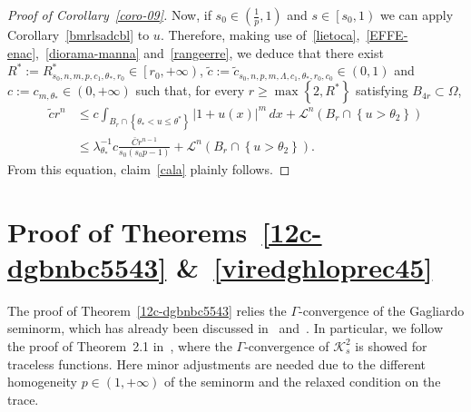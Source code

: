 \documentclass[12pt]{article}
\numberwithin{equation}{section}
\renewcommand{\leq}{\leqslant}
\renewcommand{\geq}{\geqslant}
\begin{document}
\begin{proof}[Proof of Corollary~\ref{coro-09}]
Now, if $s_0\in \left(\frac{1}{p},1\right)$ and $s\in \left[s_0,1\right)$ we can apply Corollary~\ref{bmrlsadcbl} to $u$. Therefore, making use of~\eqref{lietoca},~\eqref{EFFE-enac},~\eqref{diorama-manna} and~\eqref{rangeerre},
we deduce that there exist $R^*:=R_{s_0,n,m,p,c_1,\theta_*,r_0}^*\in\left[r_0,+\infty\right)$, $\tilde{c}:=\tilde{c}_{s_0,n,p,m,\Lambda,c_1,\theta_*,r_0,c_0}\in (0,1)$ and $c:=c_{m,\theta_*}\in(0,+\infty)$ such that, for every $r\geq \max\left\lbrace 2,R^* \right\rbrace$ satisfying $B_{4r}\subset\Omega$,
\begin{equation*}
\begin{split}
\tilde{c}r^n &\leq c \int_{B_r\cap \left\lbrace \theta_*<u\leq \theta^* \right\rbrace} \left|1+u(x)\right|^m\,dx+\mathcal{L}^n\left(B_r\cap \left\lbrace u>\theta_2\right\rbrace\right)\\
&\leq \lambda_{\theta_*}^{-1}c\frac{\bar{C}r^{n-1}}{s_0(s_0p-1)}+ \mathcal{L}^n\left(B_r\cap \left\lbrace u>\theta_2\right\rbrace\right).
\end{split}
\end{equation*}
From this equation, claim~\eqref{cala} plainly follows. 
\end{proof}


\section{Proof of Theorems~\ref{12c-dgbnbc5543} \&~\ref{viredghloprec45}}\label{nmmdqcstngiga}

The proof of Theorem~\ref{12c-dgbnbc5543} relies the $\Gamma$-convergence of the Gagliardo seminorm, which has already been discussed in~\cite{MR2033060} and~\cite{MR4544090}. In particular, we follow the proof of Theorem~2.1 in~\cite{MR4544090}, where the $\Gamma$-convergence of $\mathcal{K}_s^2$ is showed for traceless functions. Here minor adjustments are needed due to the different homogeneity $p\in (1,+\infty)$ of the seminorm and the relaxed condition on the trace. 
\end{document}

